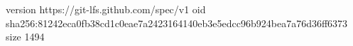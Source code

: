 version https://git-lfs.github.com/spec/v1
oid sha256:81242eca0fb38cd1c0eae7a2423164140eb3e5edcc96b924bea7a76d36ff6373
size 1494
